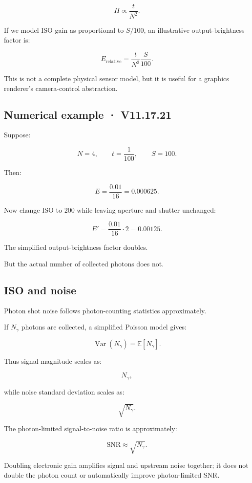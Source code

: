 \[ H\propto\frac t{N^2}. \]

If we model ISO gain as proportional to \(S/100\), an illustrative output-brightness factor is:

\[ \boxed{ E_{\mathrm{relative}} = \frac t{N^2}\frac S{100}. } \]

This is not a complete physical sensor model, but it is useful for a graphics renderer's camera-control abstraction.

\subsection{Numerical example · V11.17.21}\label{02-foundations-ii-ch036-numerical-example-v11.17.21}

Suppose:

\[ N=4,\qquad t=\frac1{100},\qquad S=100. \]

Then:

\[ E=\frac{0.01}{16}=\boxed{0.000625}. \]

Now change ISO to 200 while leaving aperture and shutter unchanged:

\[ E'=\frac{0.01}{16}\cdot2 =\boxed{0.00125}. \]

The simplified output-brightness factor doubles.

But the actual number of collected photons does not.

\subsection{ISO and noise}\label{02-foundations-ii-ch036-iso-and-noise}

Photon shot noise follows photon-counting statistics approximately.

If \(N_\gamma\) photons are collected, a simplified Poisson model gives:

\[ \operatorname{Var}(N_\gamma)=\mathbb E[N_\gamma]. \]

Thus signal magnitude scales as:

\[ N_\gamma, \]

while noise standard deviation scales as:

\[ \sqrt{N_\gamma}. \]

The photon-limited signal-to-noise ratio is approximately:

\[ \boxed{ \mathrm{SNR}\approx\sqrt{N_\gamma}. } \]

Doubling electronic gain amplifies signal and upstream noise together; it does not double the photon count or automatically improve photon-limited SNR.

